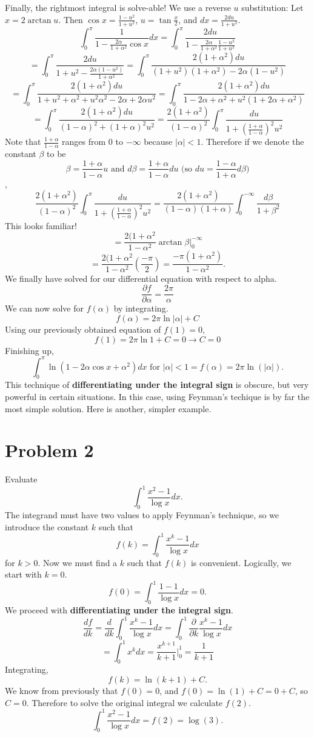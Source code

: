 \documentclass{article}
\begin{document}
Finally, the rightmost integral is solve-able! We use a reverse $u$ substitution: Let $x=2\arctan{u}$. Then $\cos{x}=\frac{1-u^2}{1+u^2}$, $u=\tan{\frac{x}{2}}$, and $dx=\frac{2du}{1+u^2}$.
$$\int_{0}^{\pi}\frac{1}{1-\frac{2\alpha}{1+\alpha^2}\cos{x}}dx = \int_{0}^{\pi}\frac{2du}{1-\frac{2\alpha}{1+\alpha^2}\frac{1-u^2}{1+u^2}}$$
$$= \int_{0}^{\pi}\frac{2du}{1+u^2-\frac{2\alpha(1-u^2)}{1+\alpha^2}} = \int_{0}^{\pi}\frac{2(1+\alpha^2)du}{(1+u^2)(1+\alpha^2)-2\alpha(1-u^2)}$$
$$= \int_{0}^{\pi}\frac{2(1+\alpha^2)du}{1+u^2+\alpha^2+u^2\alpha^2-2\alpha+2\alpha u^2} = \int_{0}^{\pi}\frac{2(1+\alpha^2)du}{1-2\alpha+\alpha^2+u^2(1+2\alpha+\alpha^2)}$$
$$= \int_{0}^{\pi}\frac{2(1+\alpha^2)du}{(1-\alpha)^2+(1+\alpha)^2u^2} = \frac{2(1+\alpha^2)}{(1-\alpha)^2}\int_{0}^{\pi}\frac{du}{1+(\frac{1+\alpha}{1-\alpha})^2u^2}$$
Note that $\frac{1+\alpha}{1-\alpha}$ ranges from 0 to $-\infty$ because $|\alpha|<1$. Therefore if we denote the constant $\beta$ to be $$\beta=\frac{1+\alpha}{1-\alpha}u \text{ and } d\beta=\frac{1+\alpha}{1-\alpha}du \text { (so } du=\frac{1-\alpha}{1+\alpha}d\beta \text{)}$$,
$$\frac{2(1+\alpha^2)}{(1-\alpha)^2}\int_{0}^{\pi}\frac{du}{1+(\frac{1+\alpha}{1-\alpha})^2u^2} = \frac{2(1+\alpha^2)}{(1-\alpha)(1+\alpha)}\int_{0}^{-\infty}\frac{d\beta}{1+\beta^2}$$
This looks familiar!
$$= \frac{2(1+\alpha^2}{1-\alpha^2}\arctan{\beta}\bigg\vert_{0}^{-\infty}$$
$$= \frac{2(1+\alpha^2}{1-\alpha^2}(\frac{-\pi}{2}) = \frac{-\pi(1+\alpha^2)}{1-\alpha^2}.$$
We finally have solved for our differential equation with respect to alpha.
$$\frac{\partial f}{\partial \alpha} = \frac{2\pi}{\alpha}$$
We can now solve for $f(\alpha)$ by integrating.
$$f(\alpha) = 2\pi\ln{|\alpha|}+C$$
Using our previously obtained equation of $f(1)=0$,
$$f(1)=2\pi\ln{1}+C=0 \rightarrow C=0$$
Finishing up,
$$\int_{0}^{\pi} \ln(1-2\alpha\cos{x}+\alpha^2)dx \text{ for } |\alpha|<1 = f(\alpha) = \boxed{2\pi\ln(|\alpha|)}.$$ 
This technique of \textbf{differentiating under the integral sign} is obscure, but very powerful in certain situations. In this case, using Feynman's techique is by far the most simple solution. Here is another, simpler example.

\section*{Problem 2}
Evaluate $$\int_{0}^{1}\frac{x^2-1}{\log{x}}dx.$$
The integrand must have two values to apply Feynman's technique, so we introduce the constant $k$ such that
$$f(k) = \int_{0}^{1}\frac{x^k-1}{\log{x}}dx$$ for $k>0$. Now we must find a $k$ such that $f(k)$ is convenient. Logically, we start with $k=0$. 
$$f(0)=\int_{0}^{1}\frac{1-1}{\log{x}}dx = 0.$$
\newline We proceed with \textbf{differentiating under the integral sign}.
$$\frac{df}{dk} = \frac{d}{dk}\int_{0}^{1}\frac{x^k-1}{\log{x}}dx = \int_{0}^{1}\frac{\partial}{\partial k}\frac{x^k-1}{\log{x}}dx$$
$$= \int_{0}^{1}x^kdx = \frac{x^{k+1}}{k+1}\bigg\vert_{0}^{1} = \frac{1}{k+1}$$
Integrating,
$$f(k)=\ln({k+1})+C.$$
We know from previously that $f(0)=0$, and $f(0)=\ln(1)+C=0+C$, so $C=0$. Therefore to solve the original integral we calculate $f(2)$.
$$\int_{0}^{1}\frac{x^2-1}{\log{x}}dx = f(2) = \boxed{\log({3})}.$$
\end{document}
